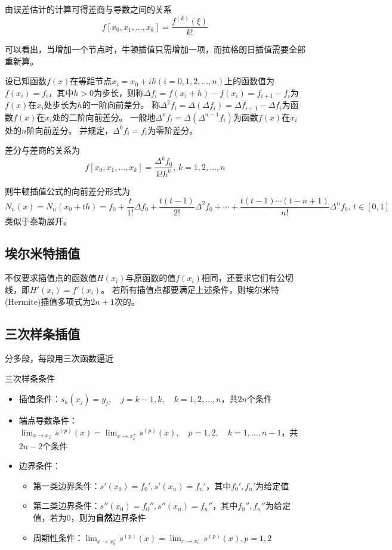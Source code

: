 由误差估计的计算可得差商与导数之间的关系
\[f[x_0,x_1,\ldots,x_k]=\frac{f^{(k)}(\xi)}{k!}\]

可以看出，当增加一个节点时，牛顿插值只需增加一项，而拉格朗日插值需要全部重新算。

\begin{definition}[差分]
设已知函数$f(x)$在等距节点$x_i=x_0+ih(i=0,1,2,\ldots,n)$上的函数值为$f(x_i)=f_i$，其中$h>0$为步长，则称$\Delta f_i=f(x_i+h)-f(x_i)=f_{i+1}-f_i$为$f(x)$在$x_i$处步长为$h$的一阶向前差分。
称$\Delta^2 f_i=\Delta(\Delta f_i)=\Delta f_{i+1}-\Delta f_i$为函数$f(x)$在$x_i$处的二阶向前差分。
一般地$\Delta^n f_i=\Delta(\Delta^{n-1} f_i)$为函数$f(x)$在$x_i$处的$n$阶向前差分。
并规定，$\Delta^0 f_i=f_i$为零阶差分。
\end{definition}
\par 差分与差商的关系为
\[f[x_0,x_1,\ldots,x_k]=\frac{\Delta^k f_0}{k!h^k},\,k=1,2,\ldots,n\]

则牛顿插值公式的向前差分形式为
\[N_n(x)=N_n(x_0+th)=f_0+\frac{t}{1!}\Delta f_0+\frac{t(t-1)}{2!}\Delta^2 f_0+\cdots+\frac{t(t-1)\cdots(t-n+1)}{n!}\Delta^n f_0,\,t\in[0,1]\]
类似于泰勒展开。

\subsection{埃尔米特插值}
不仅要求插值点的函数值$H(x_i)$与原函数的值$f(x_i)$相同，还要求它们有公切线，即$H'(x_i)=f'(x_i)$。
若所有插值点都要满足上述条件，则埃尔米特(Hermite)插值多项式为$2n+1$次的。

\subsection{三次样条插值}
分多段，每段用三次函数逼近

三次样条条件
\begin{itemize}
    \item 插值条件：$s_k(x_j)=y_j,\quad j=k-1,k,\quad k=1,2,\ldots,n$，共$2n$个条件
    \item 端点导数条件：$\lim_{x\to x_k^-}s^{(p)}(x)=\lim_{x\to x^+_k}s^{(p)}(x),\quad p=1,2,\quad k=1,\ldots,n-1$，共$2n-2$个条件
    \item 边界条件：
    \begin{itemize}
        \item 第一类边界条件：$s'(x_0)=f_0',s'(x_n)=f_n'$，其中$f_0',f_n'$为给定值
        \item 第二类边界条件：$s''(x_0)=f_0'',s''(x_n)=f_n''$，其中$f_0'',f_n''$为给定值，若为$0$，则为\textbf{自然}边界条件
        \item 周期性条件：$\lim_{x\to x_0^+}s^{(p)}(x)=\lim_{x\to x_n^-}s^{(p)}(x),p=1,2$
    \end{itemize}
\end{itemize}

